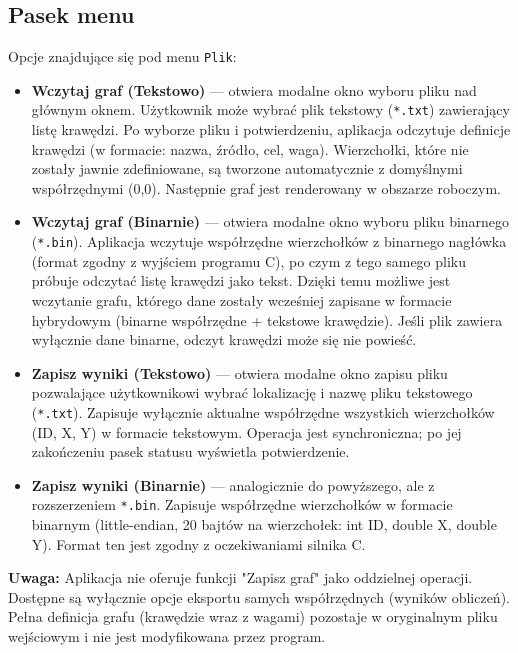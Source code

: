 \documentclass[a4paper, 11pt]{article}
\begin{document}
\subsection{Pasek menu}

Opcje znajdujące się pod menu \texttt{Plik}:
\begin{itemize}
  \item \textbf{Wczytaj graf (Tekstowo)} --- otwiera modalne okno wyboru pliku nad głównym oknem. Użytkownik może wybrać plik tekstowy (\texttt{*.txt}) zawierający listę krawędzi. Po wyborze pliku i potwierdzeniu, aplikacja odczytuje definicje krawędzi (w formacie: nazwa, źródło, cel, waga). Wierzchołki, które nie zostały jawnie zdefiniowane, są tworzone automatycznie z domyślnymi współrzędnymi (0,0). Następnie graf jest renderowany w obszarze roboczym.
  
  \item \textbf{Wczytaj graf (Binarnie)} --- otwiera modalne okno wyboru pliku binarnego (\texttt{*.bin}). Aplikacja wczytuje współrzędne wierzchołków z binarnego nagłówka (format zgodny z wyjściem programu C), po czym z tego samego pliku próbuje odczytać listę krawędzi jako tekst. Dzięki temu możliwe jest wczytanie grafu, którego dane zostały wcześniej zapisane w formacie hybrydowym (binarne współrzędne + tekstowe krawędzie). Jeśli plik zawiera wyłącznie dane binarne, odczyt krawędzi może się nie powieść.

  \item \textbf{Zapisz wyniki (Tekstowo)} --- otwiera modalne okno zapisu pliku pozwalające użytkownikowi wybrać lokalizację i nazwę pliku tekstowego (\texttt{*.txt}). Zapisuje wyłącznie aktualne współrzędne wszystkich wierzchołków (ID, X, Y) w formacie tekstowym. Operacja jest synchroniczna; po jej zakończeniu pasek statusu wyświetla potwierdzenie.

  \item \textbf{Zapisz wyniki (Binarnie)} --- analogicznie do powyższego, ale z rozszerzeniem \texttt{*.bin}. Zapisuje współrzędne wierzchołków w formacie binarnym (little-endian, 20 bajtów na wierzchołek: int ID, double X, double Y). Format ten jest zgodny z oczekiwaniami silnika C.
\end{itemize}

\textbf{Uwaga:} Aplikacja nie oferuje funkcji "Zapisz graf" jako oddzielnej operacji. Dostępne są wyłącznie opcje eksportu samych współrzędnych (wyników obliczeń). Pełna definicja grafu (krawędzie wraz z wagami) pozostaje w oryginalnym pliku wejściowym i nie jest modyfikowana przez program.
\end{document}
